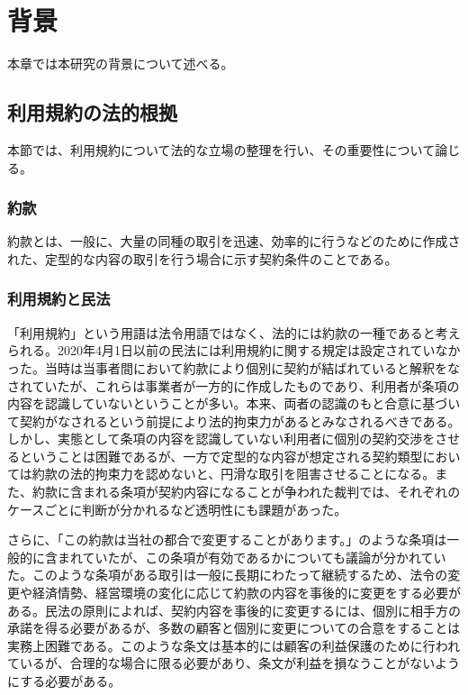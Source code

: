 \chapter{背景}
\label{background}
本章では本研究の背景について述べる。

\section{利用規約の法的根拠}
本節では、利用規約について法的な立場の整理を行い、その重要性について論じる。

\subsection{約款}
約款とは、一般に、大量の同種の取引を迅速、効率的に行うなどのために作成された、定型的な内容の取引を行う場合に示す契約条件のことである。

\subsection{利用規約と民法}
「利用規約」という用語は法令用語ではなく、法的には約款の一種であると考えられる\cite{itakura2013}。2020年4月1日以前の民法には利用規約に関する規定は設定されていなかった。当時は当事者間において約款により個別に契約が結ばれていると解釈をなされていたが、これらは事業者が一方的に作成したものであり、利用者が条項の内容を認識していないということが多い。本来、両者の認識のもと合意に基づいて契約がなされるという前提により法的拘束力があるとみなされるべきである。しかし、実態として条項の内容を認識していない利用者に個別の契約交渉をさせるということは困難であるが、一方で定型的な内容が想定される契約類型においては約款の法的拘束力を認めないと、円滑な取引を阻害させることになる。また、約款に含まれる条項が契約内容になることが争われた裁判では、それぞれのケースごとに判断が分かれるなど透明性にも課題があった\cite{hashimoto2021}。

さらに、「この約款は当社の都合で変更することがあります。」のような条項は一般的に含まれていたが、この条項が有効であるかについても議論が分かれていた。このような条項がある取引は一般に長期にわたって継続するため、法令の変更や経済情勢、経営環境の変化に応じて約款の内容を事後的に変更をする必要がある。民法の原則によれば、契約内容を事後的に変更するには、個別に相手方の承諾を得る必要があるが、多数の顧客と個別に変更についての合意をすることは実務上困難である。このような条文は基本的には顧客の利益保護のために行われているが、合理的な場合に限る必要があり、条文が利益を損なうことがないようにする必要がある。\cite{moj2020minpo}

